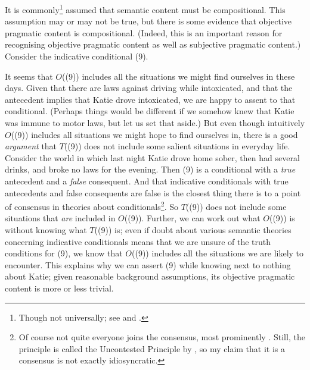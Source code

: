 It is commonly\footnote{Though not universally; see \citet{Schiffer1987} and \citet{McGee1991}.} assumed that semantic content must be compositional. This assumption may or may not be true, but there is some evidence that objective pragmatic content is compositional. (Indeed, this is an important reason for recognising objective pragmatic content as well as subjective pragmatic content.) Consider the indicative conditional (9).


\noindent It seems that \(O\)((9)) includes all the situations we might find ourselves in these days. Given that there are laws against driving while intoxicated, and that the antecedent implies that Katie drove intoxicated, we are happy to assent to that conditional. (Perhaps things would be different if we somehow knew that Katie was immune to motor laws, but let us set that aside.) But even though intuitively \(O\)((9)) includes all situations we might hope to find ourselves in, there is a good \textit{argument} that \(T\)((9)) does not include some salient situations in everyday life. Consider the world in which last night Katie drove home sober, then had several drinks, and broke no laws for the evening. Then (9) is a conditional with a \textit{true} antecedent and a \textit{false} consequent. And that indicative conditionals with true antecedents and false consequents are false is the closest thing there is to a point of consensus in theories about conditionals\footnote{Of course not quite everyone joins the consensus, most prominently \citet{McGee1985}. Still, the principle is called the Uncontested Principle by \citet{Jackson1987}, so my claim that it is a consensus is not exactly idiosyncratic.}. So \(T\)((9)) does not include some situations that \textit{are} included in \(O\)((9)). Further, we can work out what \(O\)((9)) is without knowing what \(T\)((9)) is; even if doubt about various semantic theories concerning indicative conditionals means that we are unsure of the truth conditions for (9), we know that \(O\)((9)) includes all the situations we are likely to encounter. This explains why we can assert (9) while knowing next to nothing about Katie; given reasonable background assumptions, its objective pragmatic content is more or less trivial.

